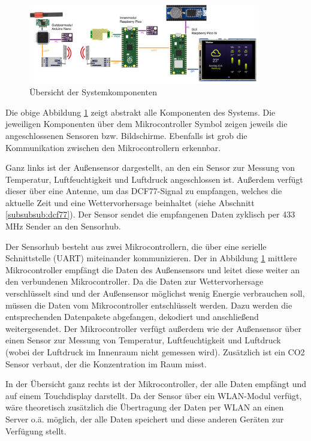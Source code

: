 \documentclass[a4paper,11pt]{article}
\begin{document}
\begin{figure}[H]
  \centering
  \includegraphics[width = 0.9\textwidth]{Systemuebersicht}
  \caption{Übersicht der Systemkomponenten}
  \label{fig:systemuebersicht}
\end{figure}

Die obige Abbildung \ref{fig:systemuebersicht} zeigt abstrakt alle Komponenten des Systems. Die jeweiligen Komponenten über dem Mikrocontroller Symbol
zeigen jeweils die angeschlossenen Sensoren bzw. Bildschirme. Ebenfalls ist grob die Kommunikation zwischen den Mikrocontrollern erkennbar. 

\vspace{0.2cm}
\noindent
Ganz links ist der Außensensor dargestellt, an den ein Sensor zur Messung von Temperatur, Luftfeuchtigkeit und Luftdruck angeschlossen ist. 
Außerdem verfügt dieser über eine Antenne, um das DCF77-Signal zu empfangen, welches die aktuelle Zeit und eine Wettervorhersage beinhaltet (siehe Abschnitt \ref{subsubsub:dcf77}).
Der Sensor sendet die empfangenen Daten zyklisch per 433 MHz Sender an den Sensorhub. 

\vspace{0.2cm}
\noindent
Der Sensorhub besteht aus zwei Mikrocontrollern, die über eine serielle Schnittstelle (UART) miteinander kommunizieren. Der in Abbildung \ref{fig:systemuebersicht} mittlere Mikrocontroller
empfängt die Daten des Außensensors und leitet diese weiter an den verbundenen Mikrocontroller. Da die Daten zur Wettervorhersage verschlüsselt sind und der Außensensor möglichst
wenig Energie verbrauchen soll, müssen die Daten vom Mikrocontroller entschlüsselt werden. Dazu werden die entsprechenden Datenpakete abgefangen, dekodiert und anschließend weitergesendet. 
Der Mikrocontroller verfügt außerdem wie der Außensensor über einen Sensor zur Messung von Temperatur, Luftfeuchtigkeit und Luftdruck (wobei der Luftdruck im Innenraum nicht gemessen wird). 
Zusätzlich ist ein CO2 Sensor verbaut, der die Konzentration im Raum misst. 

\vspace{0.2cm}
\noindent
In der Übersicht ganz rechts ist der Mikrocontroller, der alle Daten empfängt und auf einem Touchdisplay darstellt. Da der Sensor über ein WLAN-Modul verfügt, wäre theoretisch
zusätzlich die Übertragung der Daten per WLAN an einen Server o.ä. möglich, der alle Daten speichert und diese anderen Geräten zur Verfügung stellt. 
\end{document}
